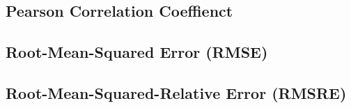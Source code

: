 \documentclass[draft,jgrga]{agutexSI2019}
\begin{document}
\subsection{Pearson Correlation Coeffienct}

\subsection{Root-Mean-Squared Error (RMSE)}

\subsection{Root-Mean-Squared-Relative Error (RMSRE)}




\end{document}
